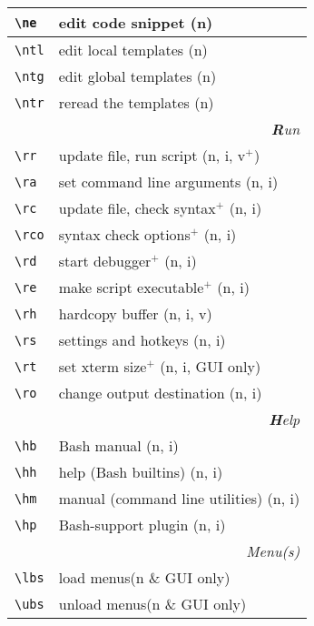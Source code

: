\documentclass[oneside,12pt,a4paper,DIV18]{scrartcl}
\begin{document}
\begin{center}
\begin{tabular}[]{|p{11mm}|p{59mm}|}
\hline \verb'\ne'  & edit code snippet          \hfill (n)\\
%
\hline \verb'\ntl' & edit local templates      \hfill (n)   \\
\hline \verb'\ntg' & edit global templates     \hfill (n)   \\
\hline \verb'\ntr' & reread the templates      \hfill (n)   \\
\hline
\hline
\multicolumn{2}{|r|}{\textsl{\textbf{R}un}} \\
\hline \verb'\rr'  & update file, run script    		\hfill (n, i, v$^+$)\\
\hline \verb'\ra'  & set command line arguments 		\hfill (n, i)\\
\hline \verb'\rc'  & update file, check syntax$^+$  \hfill (n, i)\\
\hline \verb'\rco' & syntax check options$^+$       \hfill (n, i)\\
\hline \verb'\rd'  & start debugger$^+$             \hfill (n, i)\\
\hline \verb'\re'  & make script executable$^+$     \hfill (n, i)\\
\hline \verb'\rh'  & hardcopy buffer            		\hfill (n, i, v)\\
\hline \verb'\rs'  & settings and hotkeys       		\hfill (n, i)\\
\hline \verb'\rt'  & set xterm size$^+$             \hfill (n, i, GUI only)\\
\hline \verb'\ro'  & change output destination  		\hfill (n, i)\\
\hline
\hline 
\multicolumn{2}{|r|}{\textsl{\textbf{H}elp}} \\
\hline \verb'\hb'  & Bash manual                     \hfill (n, i) \\
\hline \verb'\hh'  & help (Bash builtins)            \hfill (n, i) \\
\hline \verb'\hm'  & manual (command line utilities) \hfill (n, i) \\
\hline \verb'\hp'  & Bash-support plugin             \hfill (n, i) \\
\hline 
\hline
\multicolumn{2}{|r|}{\textsl{Menu(s)}}\\
\hline \verb'\lbs'  & load    menus\hfill \scriptsize{(n \& GUI only)}\\
\hline \verb'\ubs'  & unload  menus\hfill \scriptsize{(n \& GUI only)}\\
\hline 
\end{tabular}\\%

\end{center}
\end{document}
